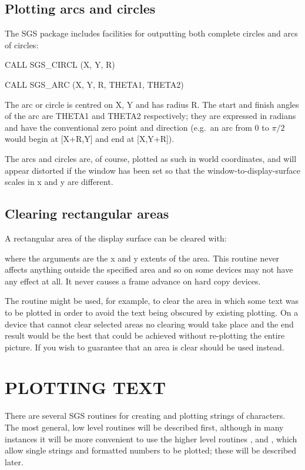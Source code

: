 \documentclass[11pt]{starlink}
\begin{document}
\subsection {Plotting arcs and circles}
The SGS package includes facilities for outputting both complete
circles and arcs of circles:
\begin{terminalv}
CALL SGS_CIRCL (X, Y, R)

CALL SGS_ARC (X, Y, R, THETA1, THETA2)
\end{terminalv}
The arc or circle is centred on X, Y and has radius R.  The start and
finish angles of the arc are THETA1 and THETA2 respectively;  they are
expressed in radians and have the conventional zero point and direction
(e.g.\ an arc from 0 to $\pi/2$ would begin at [X+R,Y] and end at [X,Y+R]).

The arcs and circles are, of course, plotted as such in
world coordinates, and will appear
distorted if the window has been set so that the
window-to-display-surface scales in
x and y are different.

\subsection {Clearing rectangular areas}\label{sec-clr-rect}
A rectangular area of the display surface can be cleared with:
\begin{terminalv}
CALL SGS_CLRBL (X1, X2, Y1, Y2)}
\end{terminalv}
where the arguments are the x and y extents of the area.  This routine never
affects anything outside the specified area and so on some devices may not
have any effect at all.  It never causes a frame advance on hard copy devices.

The routine might be used, for example, to clear the area in which some text
was to be plotted in order to avoid the text being obscured by existing
plotting.  On a device that cannot clear selected areas no clearing would
take place and the end result would be the best that could be achieved without
re-plotting the entire picture.
If you wish to guarantee that an area is clear
 should be used instead.

\section {PLOTTING TEXT}

There are several SGS routines for creating and plotting
strings of characters.  The most general, low level routines
will be described first, although in many instances it will be
more convenient to use the higher level routines
,
 and
,
which allow single strings and formatted numbers to be
plotted;  these will be described later.
\end{document}
